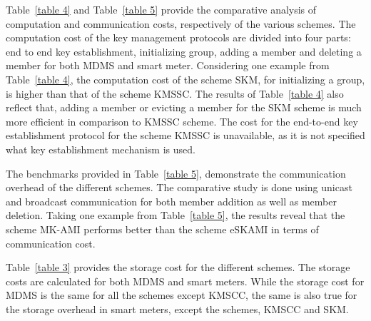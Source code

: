 Table~\ref{table 4} and Table~\ref{table 5} provide the comparative analysis of computation and communication costs, respectively of the various schemes. 
The computation cost of the key management protocols are divided into four parts: end to end key establishment, initializing group, adding a member and deleting a member for both MDMS and smart meter. Considering one example from Table~\ref{table 4}, the computation cost of the scheme SKM, for initializing a group, is higher than that of the scheme KMSSC. The results of Table~\ref{table 4} also reflect that, adding a member or evicting a member for the SKM scheme is much more efficient in comparison to KMSSC scheme. The cost for the end-to-end key establishment protocol for the scheme KMSSC is unavailable, as it is not specified what key establishment mechanism is used. 
\par The benchmarks provided in Table~\ref{table 5}, demonstrate the communication overhead of the different schemes. The comparative study is done using unicast and broadcast communication for both member addition as well as member deletion. Taking one example from Table~\ref{table 5}, the results reveal that the scheme MK-AMI performs better than the scheme eSKAMI in terms of communication cost.     
\par Table~\ref{table 3} provides the storage cost for the different schemes. The storage costs are calculated for both MDMS and smart meters. While the storage cost for MDMS is the same for all the schemes except KMSCC, the same is also true for the storage overhead in smart meters, except the schemes, KMSCC and SKM.

